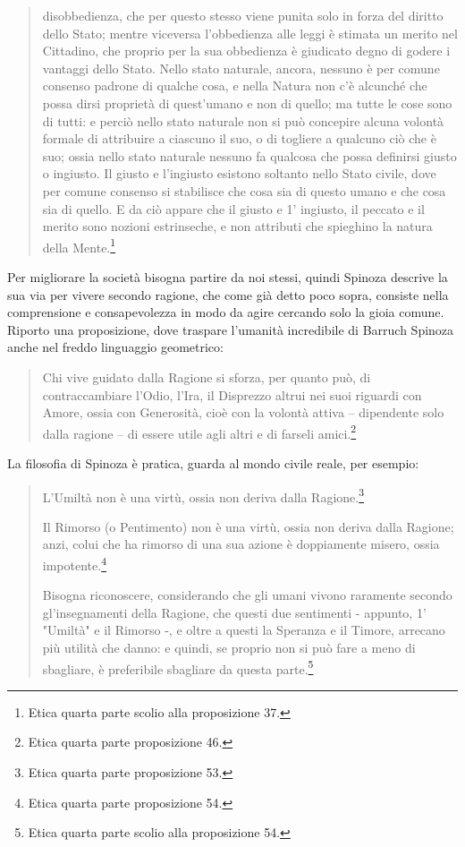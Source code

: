 \begin{quotation}
	disobbedienza, che per questo stesso viene punita solo in forza del diritto dello Stato; mentre viceversa l’obbedienza alle leggi è stimata un merito nel Cittadino, che proprio per la
	sua obbedienza è giudicato degno di godere i vantaggi dello Stato. Nello stato naturale, ancora, nessuno è per comune consenso padrone di qualche cosa, e nella Natura non c’è alcunché che possa dirsi proprietà di quest’umano e non di quello; ma tutte le cose sono di
	tutti: e perciò nello stato naturale non si può concepire alcuna volontà formale di attribuire a ciascuno il suo, o di togliere a qualcuno ciò che è suo; ossia nello stato naturale nessuno fa qualcosa che possa definirsi giusto o ingiusto. Il giusto e l’ingiusto esistono soltanto
	nello Stato civile, dove per comune consenso si stabilisce che cosa sia di questo umano e
	che cosa sia di quello. E da ciò appare che il giusto e 1’ ingiusto, il peccato e il merito sono
	nozioni estrinseche, e non attributi che spieghino la natura della Mente.\footnote{Etica quarta parte scolio alla proposizione 37.}
\end{quotation}

Per migliorare la società bisogna partire da noi stessi, quindi Spinoza descrive la sua via per vivere secondo ragione, che come già detto poco sopra, consiste nella comprensione e consapevolezza in modo da agire cercando solo la gioia comune. Riporto una proposizione, dove traspare l'umanità incredibile di Barruch Spinoza anche nel freddo linguaggio geometrico:

\begin{quotation}
	\small Chi vive guidato dalla Ragione si sforza, per quanto può, di contraccambiare l’Odio, l’Ira,
	il Disprezzo altrui nei suoi riguardi con Amore, ossia con Generosità, cioè con la volontà attiva – dipendente solo dalla ragione – di essere utile agli altri e di farseli amici.\footnote{Etica quarta parte proposizione 46.}
\end{quotation}

La filosofia di Spinoza è pratica, guarda al mondo civile reale, per esempio:

\begin{quotation}
	\small  L'Umiltà  non è una virtù, ossia non deriva dalla Ragione.\footnote{Etica quarta parte proposizione 53.}
	
	Il Rimorso (o Pentimento) non è una virtù, ossia non deriva dalla Ragione; anzi, colui
	che ha rimorso di una sua azione è doppiamente misero, ossia impotente.\footnote{Etica quarta parte proposizione 54.}
	
	Bisogna riconoscere, considerando che gli umani vivono raramente secondo gl’insegnamenti della Ragione, che questi due sentimenti - appunto, 1’ "Umiltà" e il Rimorso -, e oltre a questi la Speranza e il Timore, arrecano più utilità che danno: e quindi, se
	proprio non si può fare a meno di sbagliare, è preferibile sbagliare da questa parte.\footnote{Etica quarta parte scolio alla proposizione 54.}
\end{quotation}

